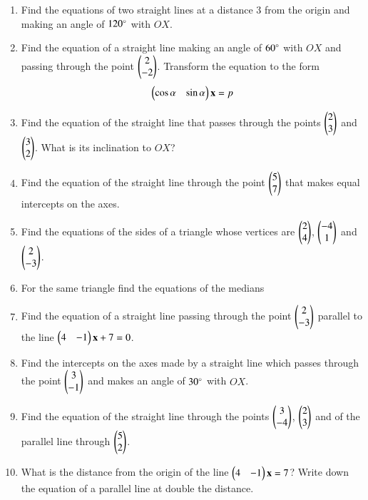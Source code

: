 \renewcommand{\theequation}{\theenumi}
\begin{enumerate}[label=\arabic*.,ref=\thesubsection.\theenumi]
\item Find the equations of two straight lines at a distance 3 from the origin and making an angle of $120 \degree$ with $OX$.
\item Find the equation of a straight line making an angle of $60\degree$ with $OX$ and passing through the point $\begin{pmatrix}2\\-2\end{pmatrix}$.
Transform the equation to the form
\begin{equation}
\begin{pmatrix}\cos\alpha &\sin \alpha\end{pmatrix}\mathbf{x} = p 
\end{equation}
\solution

\item Find the equation of the straight line that passes through the points $\begin{pmatrix}2\\3\end{pmatrix}$ and $\begin{pmatrix}3\\2\end{pmatrix}$. What is its inclination
to $OX$?
\item Find the equation of the straight line through the point $\begin{pmatrix}5\\7\end{pmatrix}$ that makes equal intercepts on the axes.
\item Find the equations of the sides of a triangle whose vertices are $\begin{pmatrix}2\\4\end{pmatrix}$, $\begin{pmatrix}-4\\1\end{pmatrix}$ and $\begin{pmatrix}2\\-3\end{pmatrix}$.
\item For the same triangle find the equations of the medians 
\item Find the equation of a straight line passing through the point $\begin{pmatrix}2\\-3\end{pmatrix}$ parallel to the line $\begin{pmatrix}4 & -1\end{pmatrix}\mathbf{x} + 7 =0$.
\item Find the intercepts on the axes made by a straight line which passes through the point $\begin{pmatrix}3\\-1\end{pmatrix}$ and makes an angle
of $30\degree$ with $OX$.
\item Find the equation of the straight line through the points $\begin{pmatrix}3\\-4\end{pmatrix}$, $\begin{pmatrix}2\\3\end{pmatrix}$ and of the
parallel line through $\begin{pmatrix}5\\2\end{pmatrix}$.
\item What is the distance from the origin of the line $\begin{pmatrix}4 & -1\end{pmatrix}\mathbf{x} = 7$? Write down the equation of a parallel line at double the distance.

\end{enumerate}
